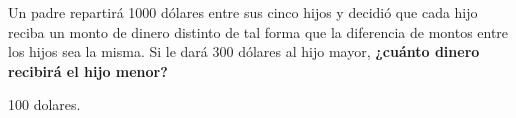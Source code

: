 Un padre repartirá 1000 dólares entre sus cinco hijos y decidió que cada hijo reciba un monto de dinero distinto de tal forma que la diferencia de montos entre los hijos sea la misma.
Si le dará 300 dólares al hijo mayor,
\textbf{¿cuánto dinero recibirá el hijo menor?}

\begin{solutionbox}{2cm}
    100 dolares.
\end{solutionbox}
